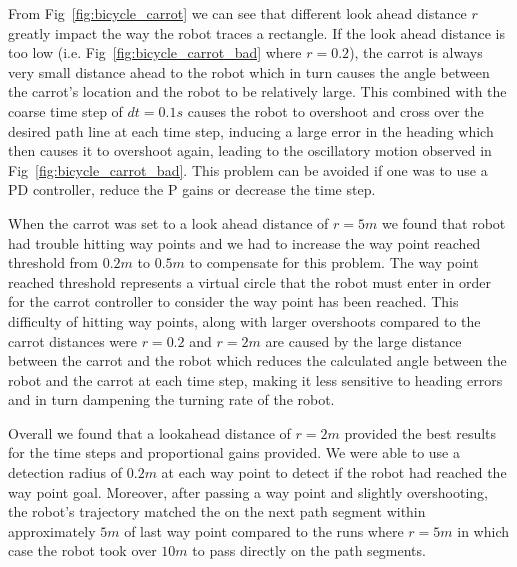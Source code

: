 \documentclass{article}
\begin{document}
From Fig~\ref{fig:bicycle_carrot} we can see that different look ahead distance $r$ greatly impact the way the robot traces a rectangle. If the look ahead distance is too low (i.e. Fig~\ref{fig:bicycle_carrot_bad} where $r = 0.2$), the carrot is always very small distance ahead to the robot which in turn causes the angle between the carrot's location and the robot to be relatively large. This combined with the coarse time step of $dt = 0.1s$ causes the robot to overshoot and cross over the desired path line at each time step, inducing a large error in the heading which then causes it to overshoot again, leading to the oscillatory motion observed in Fig~\ref{fig:bicycle_carrot_bad}. This problem can be avoided if one was to use a PD controller, reduce the P gains or decrease the time step. 

When the carrot was set to a look ahead distance of $r = 5m$ we found that robot had trouble hitting way points and we had to increase the way point reached threshold from $0.2 m $ to $0.5m$ to compensate for this problem. The way point reached threshold represents a virtual circle that the robot must enter in order for the carrot controller to consider the way point has been reached. This difficulty of hitting way points, along with larger overshoots compared to the carrot distances were $r= 0.2$ and $r = 2m$ are caused by the large distance between the carrot and the robot which reduces the calculated angle between the robot and the carrot at each time step, making it less sensitive to heading errors and in turn dampening the turning rate of the robot. 

Overall we found that a lookahead distance of $r = 2m$ provided the best results for the time steps and proportional gains provided. We were able to use a detection radius of $0.2m$ at each way point to detect if the robot had reached the way point goal. Moreover, after passing a way point and slightly overshooting, the robot's trajectory matched the on the next path segment within approximately $5m$ of last way point compared to the runs where $r = 5m$ in which case the robot took over $10m$ to pass directly on the path segments. 
\end{document}
